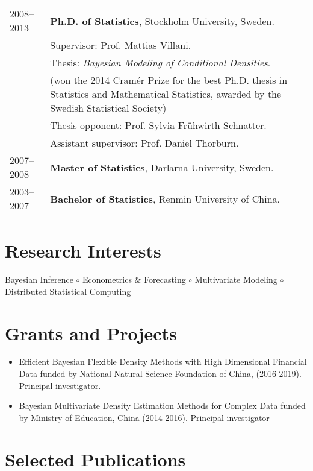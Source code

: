 \documentclass[twoside,a4paper,10.5pt]{article}
\begin{document}
\begin{tabular}{ l  p{} l}
  2008--2013 & \textbf{Ph.D. of Statistics}, Stockholm University, Sweden. \\
             & Supervisor: Prof. Mattias Villani.                          \\

             & Thesis: \emph{Bayesian Modeling of Conditional Densities}. \\
             & (won the 2014 Cramér Prize for the best Ph.D. thesis in Statistics and Mathematical Statistics, awarded by the Swedish Statistical Society) \\
             & Thesis opponent: Prof. Sylvia Frühwirth-Schnatter.               \\
             & Assistant supervisor: Prof. Daniel Thorburn.                     \\
  2007--2008 & \textbf{Master of Statistics}, Darlarna
               University, Sweden.                                             \\

 2003--2007 & \textbf{Bachelor of Statistics}, Renmin University of China. \\
\end{tabular}

\section*{Research Interests}

Bayesian Inference $\circ$ Econometrics \& Forecasting $\circ$ Multivariate Modeling $\circ$ Distributed Statistical Computing


\section*{Grants and Projects}
\begin{itemize}
\item Efficient Bayesian Flexible Density Methods with High Dimensional Financial Data funded by National Natural Science Foundation of China, (2016-2019). Principal investigator.

\item Bayesian Multivariate Density Estimation Methods for Complex Data funded by Ministry of Education, China (2014-2016). Principal investigator

\end{itemize}

\section*{Selected Publications}
\end{document}
